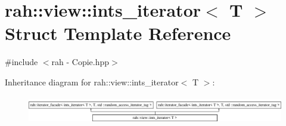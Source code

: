 \hypertarget{structrah_1_1view_1_1ints__iterator}{}\section{rah\+::view\+::ints\+\_\+iterator$<$ T $>$ Struct Template Reference}
\label{structrah_1_1view_1_1ints__iterator}


{\ttfamily \#include $<$rah -\/ Copie.\+hpp$>$}

Inheritance diagram for rah\+::view\+::ints\+\_\+iterator$<$ T $>$\+:\begin{figure}[H]
\begin{center}
\leavevmode
\includegraphics[height=1.206897cm]{structrah_1_1view_1_1ints__iterator}
\end{center}
\end{figure}
